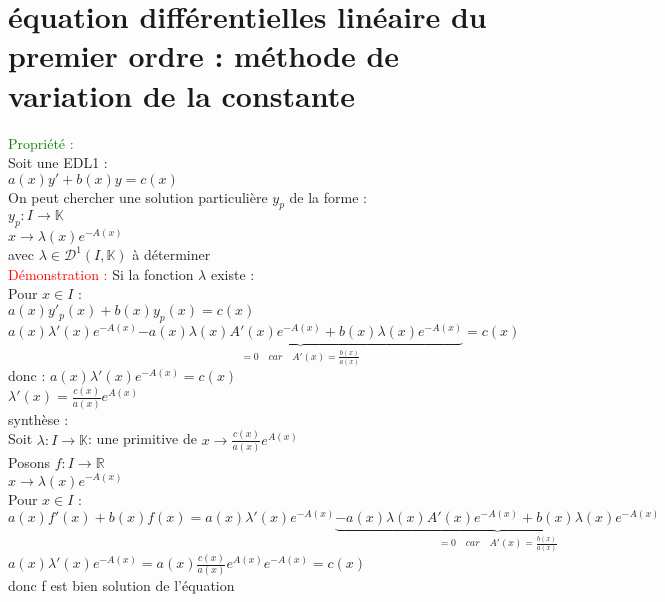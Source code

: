 \documentclass{article}
\begin{document}
	\section{équation différentielles linéaire du premier ordre : méthode de variation de la constante}
	\textcolor{green}{Propriété :} \\ 
	Soit une EDL1 : \\ 
	$a(x)y'+b(x)y=c(x)$ \\ 
	On peut chercher une solution particulière $y_p$ de la forme : \\ 
	$y_p : I \rightarrow \mathbb{K}$ \\ 
	\indent $x \rightarrow \lambda(x)e^{-A(x)}$ \\ 
	     avec $ \lambda \in \mathcal{D}^1(I,\mathbb{K})$ à déterminer \\ 
	 \textcolor{red}{Démonstration :} Si la fonction $\lambda$ existe : \\ 
	 Pour $x \in I$ : \\ 
	 \indent $a(x)y'_p(x)+b(x)y_p(x)=c(x)$ \\ 
	 $a(x)\lambda'(x)e^{-A(x)}\underbrace{-a(x)\lambda(x) A'(x)e^{-A(x)}+b(x) \lambda(x) e^{-A(x)}}_{=0 \quad car \quad A'(x)=\frac{b(x)}{a(x)}}=c(x)$ \\ 
	 donc : $a(x)\lambda'(x)e^{-A(x)}=c(x)$ \\ 
	 \indent $\lambda'(x)= \frac{c(x)}{a(x)}e^{A(x)}$ \\ 
	 synthèse : \\ 
	 Soit $\lambda : I \rightarrow \mathbb{K}$: une primitive de $x \rightarrow \frac{c(x)}{a(x)}e^{A(x)}$ \\ 
	 Posons $f : I \rightarrow \mathbb{R}$ \\ 
	 \indent $x \rightarrow \lambda(x)e^{-A(x)}$ \\ 
	 Pour $x \in I$ : \\ 
	 $a(x)f'(x)+b(x)f(x)=a(x)\lambda'(x)e^{-A(x)}\underbrace{-a(x)\lambda(x)A'(x)e^{-A(x)}+b(x)\lambda(x)e^{-A(x)}}_{=0 \quad car \quad A'(x)=\frac{b(x)}{a(x)}}$ \\ 
	 $a(x)\lambda'(x)e^{-A(x)}=a(x)\frac{c(x)}{a(x)}e^{A(x)}e^{-A(x)} =c(x)$ \\ 
	 donc f est bien solution de l'équation \\
\end{document}
